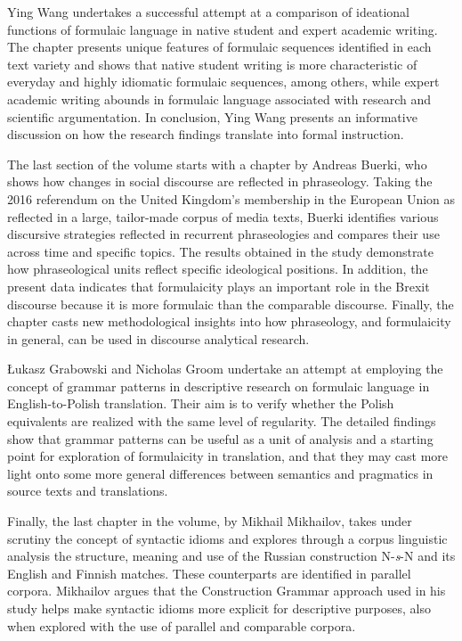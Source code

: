 \documentclass[output=paper]{langsci/langscibook}
\begin{document}
Ying Wang undertakes a successful attempt at a comparison of ideational functions of formulaic language in native student and expert academic writing. The chapter presents unique features of formulaic sequences identified in each text variety and shows that native student writing is more characteristic of everyday and highly idiomatic formulaic sequences, among others, while expert academic writing abounds in formulaic language associated with research and scientific argumentation. In conclusion, Ying Wang presents an informative discussion on how the research findings translate into formal instruction.



The last section of the volume starts with a chapter by Andreas Buerki, who shows how changes in social discourse are reflected in phraseology. Taking the 2016 referendum on the United Kingdom’s membership in the European Union as reflected in a large, tailor-made corpus of media texts, Buerki identifies various discursive strategies reflected in recurrent phraseologies and compares their use across time and specific topics. The results obtained in the study demonstrate how phraseological units reflect specific ideological positions. In addition, the present data indicates that formulaicity plays an important role in the Brexit discourse because it is more formulaic than %
the comparable discourse. Finally, the chapter casts new methodological insights into how phraseology, and formulaicity in general, can be used in discourse analytical research.



Łukasz Grabowski and Nicholas Groom undertake an attempt at employing the concept of grammar patterns in descriptive research on formulaic language in English-to-Polish translation. Their aim is to verify whether the Polish equivalents are realized with the same level of regularity. The detailed findings show that grammar patterns can be useful as a unit of analysis and a starting point for exploration of formulaicity in translation, and that they may cast more light onto some more general differences between semantics and pragmatics in source texts and translations.



Finally, the last chapter in the volume, by Mikhail Mikhailov,  takes under scrutiny the concept of syntactic idioms and explores through a corpus linguistic analysis the structure, meaning and use of the Russian construction N-\textit{s}{}-N and its English and Finnish matches. These counterparts are identified in parallel corpora. Mikhailov argues that the Construction Grammar approach used in his study helps make syntactic idioms more explicit for descriptive purposes, also when explored with the use of parallel and comparable corpora.
\end{document}
